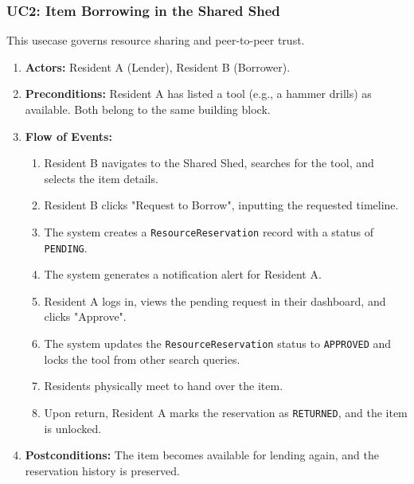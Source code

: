 \subsubsection{UC2: Item Borrowing in the Shared Shed}
This usecase governs resource sharing and peer-to-peer trust.
\begin{enumerate}
    \item \textbf{Actors:} Resident A (Lender), Resident B (Borrower).
    \item \textbf{Preconditions:} Resident A has listed a tool (e.g., a hammer drills) as available. Both belong to the same building block.
    \item \textbf{Flow of Events:}
    \begin{enumerate}
        \item Resident B navigates to the Shared Shed, searches for the tool, and selects the item details.
        \item Resident B clicks "Request to Borrow", inputting the requested timeline.
        \item The system creates a \texttt{ResourceReservation} record with a status of \texttt{PENDING}.
        \item The system generates a notification alert for Resident A.
        \item Resident A logs in, views the pending request in their dashboard, and clicks "Approve".
        \item The system updates the \texttt{ResourceReservation} status to \texttt{APPROVED} and locks the tool from other search queries.
        \item Residents physically meet to hand over the item.
        \item Upon return, Resident A marks the reservation as \texttt{RETURNED}, and the item is unlocked.
    \end{enumerate}
    \item \textbf{Postconditions:} The item becomes available for lending again, and the reservation history is preserved.
\end{enumerate}

